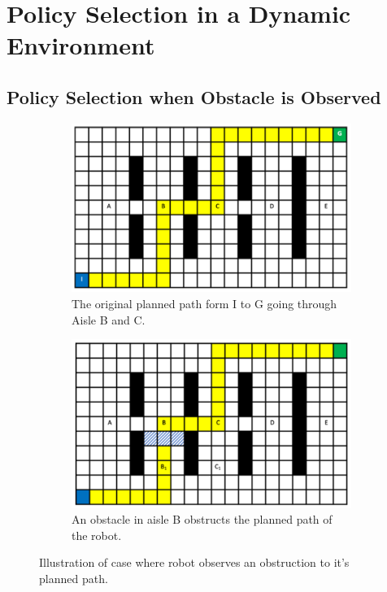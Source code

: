 \documentclass[a4paper,12pt]{article}
\begin{document}
	\pagebreak
	
	\tableofcontents
	
	\pagebreak
	
	\section{Policy Selection in a Dynamic Environment}
	\label{sec:policySelectionInADynamicEnvironment}
	
		\subsection{Policy Selection when Obstacle is Observed}
		\label{sec:policySelectionWhenObstacleIsObserved}
		
			\begin{figure}[H]
				\centering
				\begin{subfigure}{.4\textwidth}
					\centering
					\includegraphics[width=\linewidth]{originalPlannedPath.png}
					\caption{The original planned path form I to G going through Aisle B and C.}
					\label{fig:originalPlannedPath}
				\end{subfigure}
				\begin{subfigure}{.4\textwidth}
					\centering
					\includegraphics[width=\linewidth]{blockedAisleB.png}
					\caption{An obstacle in aisle B obstructs the planned path of the robot.}
					\label{fig:blockedAisleB}
				\end{subfigure}
				\caption{Illustration of case where robot observes an obstruction to it's planned path.}
				\label{fig:task1_1Figures}
			\end{figure}
			
\end{document}
